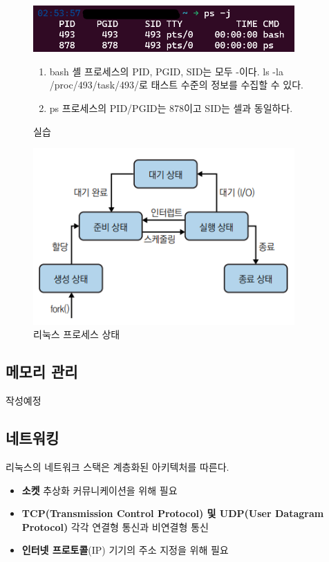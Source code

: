 \begin{figure}[h]
    \centering
    \includegraphics[width=10cm]{resource/ps-example.png}
    \caption{실습}
    \begin{enumerate}
        \item bash 셸 프로세스의 PID, PGID, SID는 모두 -이다.\newline
            ls -la /proc/493/task/493/로 태스트 수준의 정보를 수집할 수 있다.
        \item ps 프로세스의 PID/PGID는 878이고 SID는 셀과 동일하다.
    \end{enumerate}
\end{figure}

\begin{figure}
    \centering
    \includegraphics[width=10cm]{resource/2-2.png}
    \caption{리눅스 프로세스 상태}
\end{figure}


\subsection{메모리 관리}
작성예정

\subsection{네트워킹}
리눅스의 네트워크 스택은 계층화된 아키텍처를 따른다.

\begin{itemize}
    \item \textbf{소켓}\newline
        추상화 커뮤니케이션을 위해 필요
    \item \textbf{TCP(Transmission Control Protocol) 및 UDP(User Datagram Protocol)}\newline
        각각 연결형 통신과 비연결형 통신
    \item \textbf{인터넷 프로토콜}(IP)\newline
        기기의 주소 지정을 위해 필요
\end{itemize}

